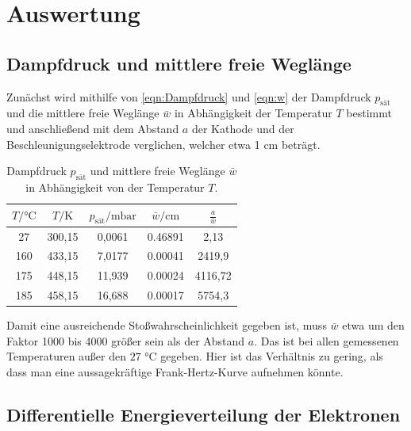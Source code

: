 \section{Auswertung}
\label{sec:Auswertung}

\subsection{Dampfdruck und mittlere freie Weglänge}

Zunächst wird mithilfe von \autoref{eqn:Dampfdruck} und \autoref{eqn:w} der Dampfdruck $p_{\mathrm{sät}}$ und die mittlere
freie Weglänge $\bar{w}$ in Abhängigkeit der Temperatur $T$ bestimmt und anschließend mit dem
Abstand $a$ der Kathode und der Beschleunigungselektrode verglichen, welcher etwa 1 $\si{\centi\meter}$
beträgt.\\

\begin{table}[!h]
  \begin{center}
    \begin{tabular}{|c|c|c|c|c|}
      \hline
      $T / \si{\celsius}$ & $T / \si{\kelvin}$ & $p_{\mathrm{sät}} / \si{\milli\bar}$ & $\bar{w} / \si{\centi\meter}$ & $\frac{a}{\bar{w}}$\\
      \hline
      \hline
      27  & 300,15 & 0,0061  & 0.46891 & 2,13\\
      160 & 433,15 & 7,0177  & 0.00041 & 2419,9\\
      175 & 448,15 & 11,939  & 0.00024 & 4116,72\\
      185 & 458,15 & 16,688  & 0.00017 & 5754,3\\
      \hline
    \end{tabular}
    \caption{Dampfdruck $p_\mathrm{sät}$ und mittlere freie Weglänge $\bar{w}$ in Abhängigkeit von der Temperatur $T$.}
    \label{tab:weg}
  \end{center}
\end{table}

Damit eine ausreichende Stoßwahrscheinlichkeit gegeben ist, muss $\bar{w}$ etwa um den Faktor
1000 bis 4000 größer sein als der Abstand $a$. Das ist bei allen gemessenen Temperaturen außer
den $27 \, \, \si{\celsius}$ gegeben. Hier ist das Verhältnis zu gering, als dass man eine aussagekräftige
Frank-Hertz-Kurve aufnehmen könnte.\\

\subsection{Differentielle Energieverteilung der Elektronen}

